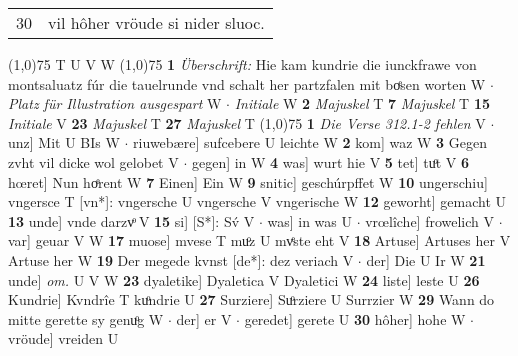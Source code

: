 \documentclass[8pt,a4paper,notitlepage]{article}
\begin{document}
\begin{table}[ht]
\begin{minipage}[t]{0.5\linewidth}
\begin{tabular}{rl}
30 & vil hôher vröude si nider sluoc.\\ 
\end{tabular}
\scriptsize
\line(1,0){75} \newline
T U V W \newline
\line(1,0){75} \newline
\textbf{1} \textit{Überschrift:} Hie kam kundrie die iunckfrawe von montsaluatz fúr die tauelrunde vnd schalt her partzfalen mit boͤsen worten W   $\cdot$ \textit{Platz für Illustration ausgespart} W   $\cdot$ \textit{Initiale} W  \textbf{2} \textit{Majuskel} T  \textbf{7} \textit{Majuskel} T  \textbf{15} \textit{Initiale} V  \textbf{23} \textit{Majuskel} T  \textbf{27} \textit{Majuskel} T  \newline
\line(1,0){75} \newline
\textbf{1} \textit{Die Verse 312.1-2 fehlen} V   $\cdot$ unz] Mit U BIs W  $\cdot$ riuwebære] sufcebere U leichte W \textbf{2} kom] waz W \textbf{3} Gegen zvht vil dicke wol gelobet V  $\cdot$ gegen] in W \textbf{4} was] wurt hie V \textbf{5} tet] tuͦt V \textbf{6} hœret] Nun hoͤrent W \textbf{7} Einen] Ein W \textbf{9} snitic] geschúrpffet W \textbf{10} ungerschiu] vngersce T [vn*]: vngersche U vngersche V vngerische W \textbf{12} geworht] gemacht U \textbf{13} unde] vnde darzvͦ V \textbf{15} si] [S*]: Sv́ V  $\cdot$ was] in was U  $\cdot$ vrœlîche] frowelich V  $\cdot$ var] geuar V W \textbf{17} muose] mvese T muͦz U mvͤste eht V \textbf{18} Artuse] Artuses her V Artuse her W \textbf{19} Der megede kvnst [de*]: dez veriach V  $\cdot$ der] Die U Ir W \textbf{21} unde] \textit{om.} U V W \textbf{23} dyaletike] Dyaletica V Dyaletici W \textbf{24} liste] leste U \textbf{26} Kundrie] Kvndrîe T kuͦndrie U \textbf{27} Surziere] Suͦrziere U Surrzier W \textbf{29} Wann do mitte gerette sy genuͦg W  $\cdot$ der] er V  $\cdot$ geredet] gerete U \textbf{30} hôher] hohe W  $\cdot$ vröude] vreiden U \newline
\end{minipage}
\end{table}
\end{document}
